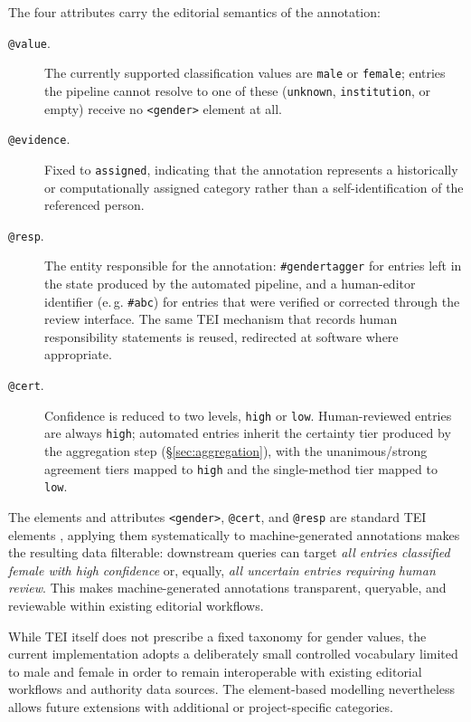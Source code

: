 \documentclass{eceasst}
\newcommand{\eg}{e.\,g.}
\begin{document}
The four attributes carry the editorial semantics of the annotation:

\begin{description}
  \item[\texttt{@value}.] The currently supported classification values are \texttt{male} or \texttt{female}; entries the pipeline cannot resolve to one of these (\texttt{unknown}, \texttt{institution}, or empty) receive no \texttt{<gender>} element at all.
  \item[\texttt{@evidence}.] Fixed to \texttt{assigned}, indicating that the annotation represents a historically or computationally assigned category rather than a self-identification of the referenced person. 
  \item[\texttt{@resp}.] The entity responsible for the annotation: \texttt{\#gendertagger} for entries left in the state produced by the automated pipeline, and a human-editor identifier (\eg{} \texttt{\#abc}) for entries that were verified or corrected through the review interface. The same TEI mechanism that records human responsibility statements is reused, redirected at software where appropriate.
  \item[\texttt{@cert}.] Confidence is reduced to two levels, \texttt{high} or \texttt{low}. Human-reviewed entries are always \texttt{high}; automated entries inherit the certainty tier produced by the aggregation step (\S\ref{sec:aggregation}), with the unanimous/strong agreement tiers mapped to \texttt{high} and the single-method tier mapped to \texttt{low}.
\end{description}

The elements and attributes \texttt{<gender>}, \texttt{@cert}, and \texttt{@resp} are standard TEI elements \cite{tei_consortium_tei_2025, beshero-bondar_revising_2024}, applying them systematically to machine-generated annotations makes the resulting data filterable: downstream queries can target \emph{all entries classified female with high confidence} or, equally, \emph{all uncertain entries requiring human review}. This makes machine-generated annotations transparent, queryable, and reviewable within existing editorial workflows.

While TEI itself does not prescribe a fixed taxonomy for gender values, the current implementation adopts a deliberately small controlled vocabulary limited to male and female in order to remain interoperable with existing editorial workflows and authority data sources. The element-based modelling nevertheless allows future extensions with additional or project-specific categories.
\end{document}
